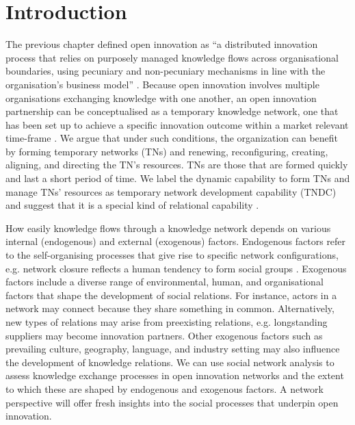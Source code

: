\section{Introduction}

The previous chapter defined open innovation as \enquote{a distributed innovation process that relies on purposely managed knowledge flows across organisational boundaries, using pecuniary and non-pecuniary mechanisms in line with the organisation’s business model} \citep{chesbrough2014explicating}. Because open innovation involves multiple organisations exchanging knowledge with one another, an open innovation partnership can be conceptualised as a temporary knowledge network, one that has been set up to achieve a specific innovation outcome within a market relevant time-frame \citep{perez2013temporary,cococcioni2014exploring}. \medskip
We argue that under such conditions, the organization can benefit by forming temporary networks (TNs) and renewing, reconfiguring, creating, aligning, and directing the TN’s resources. TNs are those that are formed quickly and last a short period of time. We label the dynamic capability to form TNs and manage TNs’ resources as temporary network development capability (TNDC) and suggest that it is a special kind of relational capability \citep{perez2013temporary}.

How easily knowledge flows through a knowledge network depends on various internal (endogenous) and external (exogenous) factors. Endogenous factors refer to the self\hyp{}organising processes that give rise to specific network configurations, e.g. network closure reflects a human tendency to form social groups \citep{robins2015doing}. Exogenous factors include a diverse range of environmental, human, and organisational factors that shape the development of social relations. For instance, actors in a network may connect because they share something in common. Alternatively, new types of relations may arise from preexisting relations, e.g. longstanding suppliers may become innovation partners. Other exogenous factors such as prevailing culture, geography, language, and industry setting may also influence the development of knowledge relations. We can use social network analysis to assess knowledge exchange processes in open innovation networks and the extent to which these are shaped by endogenous and exogenous factors. A network perspective will offer fresh insights into the social processes that underpin open innovation. \medskip

